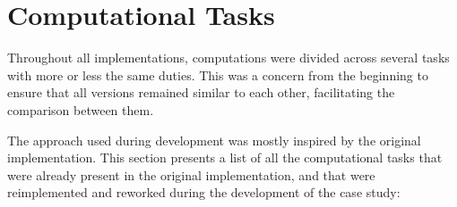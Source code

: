 \documentclass[main.tex]{subfiles}
\begin{document}
\section{Computational Tasks} \label{section:kernels}

Throughout all implementations, computations were divided across several tasks with more or less the same duties. This was a concern from the beginning to ensure that all versions remained similar to each other, facilitating the comparison between them.

The approach used during development was mostly inspired by the original implementation. This section presents a list of all the computational tasks that were already present in the original implementation, and that were reimplemented and reworked during the development of the case study:
\end{document}
